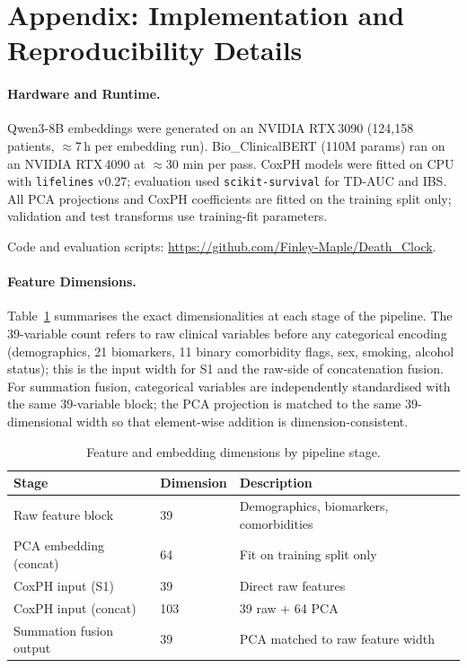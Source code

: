 \section*{Appendix: Implementation and Reproducibility Details}
\label{app:impl}

\paragraph{Hardware and Runtime.}
Qwen3-8B embeddings were generated on an NVIDIA RTX\,3090
(124{,}158 patients, $\approx$7\,h per embedding run).
Bio\_ClinicalBERT (110M params) ran on an NVIDIA RTX\,4090 at
$\approx$30 min per pass.
CoxPH models were fitted on CPU with \texttt{lifelines} v0.27;
evaluation used \texttt{scikit-survival} for TD-AUC and IBS.
All PCA projections and CoxPH coefficients are fitted on the training
split only; validation and test transforms use training-fit parameters.
\begin{sloppypar}Code and evaluation scripts:
{\small\url{https://github.com/Finley-Maple/Death\_Clock}}.\end{sloppypar}

\paragraph{Feature Dimensions.}
Table~\ref{tab:dims} summarises the exact dimensionalities at each stage of
the pipeline.
The 39-variable count refers to raw clinical variables before any categorical
encoding (demographics, 21 biomarkers, 11 binary comorbidity flags, sex,
smoking, alcohol status); this is the input width for S1 and the raw-side
of concatenation fusion.
For summation fusion, categorical variables are independently standardised
with the same 39-variable block; the PCA projection is matched to the same
39-dimensional width so that element-wise addition is dimension-consistent.

\begin{table}[H]
\centering
\caption{Feature and embedding dimensions by pipeline stage.}
\label{tab:dims}
\begin{tabular}{lll}
\toprule
Stage & Dimension & Description \\
\midrule
Raw feature block          & 39  & Demographics, biomarkers, comorbidities \\
PCA embedding (concat)     & 64  & Fit on training split only \\
CoxPH input (S1)           & 39  & Direct raw features \\
CoxPH input (concat)       & 103 & 39 raw $+$ 64 PCA \\
Summation fusion output    & 39  & PCA matched to raw feature width \\
\bottomrule
\end{tabular}
\end{table}
